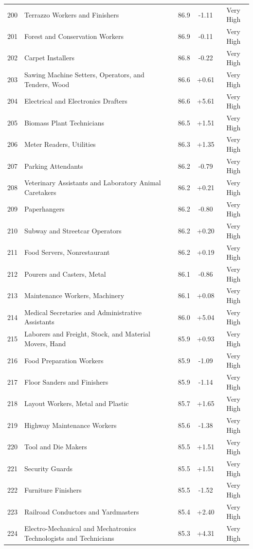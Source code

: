{\begin{longtable}{rp{7cm}ccc}
200 & Terrazzo Workers and Finishers & 86.9 & -1.11 & Very High \\
201 & Forest and Conservation Workers & 86.9 & -0.11 & Very High \\
202 & Carpet Installers & 86.8 & -0.22 & Very High \\
203 & Sawing Machine Setters, Operators, and Tenders, Wood & 86.6 & +0.61 & Very High \\
204 & Electrical and Electronics Drafters & 86.6 & +5.61 & Very High \\
205 & Biomass Plant Technicians & 86.5 & +1.51 & Very High \\
206 & Meter Readers, Utilities & 86.3 & +1.35 & Very High \\
207 & Parking Attendants & 86.2 & -0.79 & Very High \\
208 & Veterinary Assistants and Laboratory Animal Caretakers & 86.2 & +0.21 & Very High \\
209 & Paperhangers & 86.2 & -0.80 & Very High \\
210 & Subway and Streetcar Operators & 86.2 & +0.20 & Very High \\
211 & Food Servers, Nonrestaurant & 86.2 & +0.19 & Very High \\
212 & Pourers and Casters, Metal & 86.1 & -0.86 & Very High \\
213 & Maintenance Workers, Machinery & 86.1 & +0.08 & Very High \\
214 & Medical Secretaries and Administrative Assistants & 86.0 & +5.04 & Very High \\
215 & Laborers and Freight, Stock, and Material Movers, Hand & 85.9 & +0.93 & Very High \\
216 & Food Preparation Workers & 85.9 & -1.09 & Very High \\
217 & Floor Sanders and Finishers & 85.9 & -1.14 & Very High \\
218 & Layout Workers, Metal and Plastic & 85.7 & +1.65 & Very High \\
219 & Highway Maintenance Workers & 85.6 & -1.38 & Very High \\
220 & Tool and Die Makers & 85.5 & +1.51 & Very High \\
221 & Security Guards & 85.5 & +1.51 & Very High \\
222 & Furniture Finishers & 85.5 & -1.52 & Very High \\
223 & Railroad Conductors and Yardmasters & 85.4 & +2.40 & Very High \\
224 & Electro-Mechanical and Mechatronics Technologists and Technicians & 85.3 & +4.31 & Very High \\

\end{longtable}}
